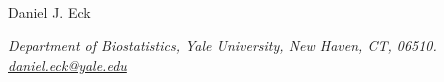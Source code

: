 \documentclass[11pt]{article}\usepackage[]{graphicx}\usepackage[]{color}
\begin{document}
\begin{center}

 \\

\vspace{.2in}

Daniel J. Eck

\vspace{.01in}

\textit{Department of Biostatistics, Yale University, New Haven, CT, 06510. \\ \url{daniel.eck@yale.edu}}

\vspace{.1in}

\end{center}


\end{document}
